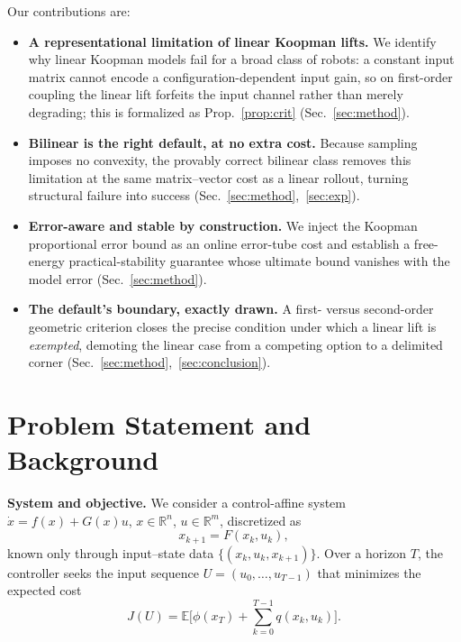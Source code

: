 \documentclass[lettersize,journal]{IEEEtran}
\theoremstyle{remark}
\begin{document}
\noindent Our contributions are:
\begin{itemize}
\item \textbf{A representational limitation of linear Koopman lifts.} We identify why linear Koopman models fail for a broad class of robots: a constant input matrix cannot encode a configuration-dependent input gain, so on first-order coupling the linear lift forfeits the input channel rather than merely degrading; this is formalized as Prop.~\ref{prop:crit} (Sec.~\ref{sec:method}).
\item \textbf{Bilinear is the right default, at no extra cost.} Because sampling imposes no convexity, the provably correct bilinear class removes this limitation at the same matrix--vector cost as a linear rollout, turning structural failure into success (Sec.~\ref{sec:method},~\ref{sec:exp}).
\item \textbf{Error-aware and stable by construction.} We inject the Koopman proportional error bound as an online error-tube cost and establish a free-energy practical-stability guarantee whose ultimate bound vanishes with the model error (Sec.~\ref{sec:method}).
\item \textbf{The default's boundary, exactly drawn.} A first- versus second-order geometric criterion closes the precise condition under which a linear lift is \emph{exempted}, demoting the linear case from a competing option to a delimited corner (Sec.~\ref{sec:method},~\ref{sec:conclusion}).
\end{itemize}

\section{Problem Statement and Background}\label{sec:background}
\textbf{System and objective.}
We consider a control-affine system $\dot x = f(x)+G(x)u$, $x\in\mathbb R^n$, $u\in\mathbb R^m$, discretized as
\begin{equation}\label{eq:dyn}
x_{k+1} = F(x_k,u_k),
\end{equation}
known only through input--state data $\{(x_k,u_k,x_{k+1})\}$.
Over a horizon $T$, the controller seeks the input sequence $U=(u_0,\dots,u_{T-1})$ that minimizes the expected cost
\begin{equation}\label{eq:cost}
J(U) = \mathbb{E}\Big[\phi(x_T) + \textstyle\sum_{k=0}^{T-1} q(x_k,u_k)\Big].
\end{equation}
\end{document}
